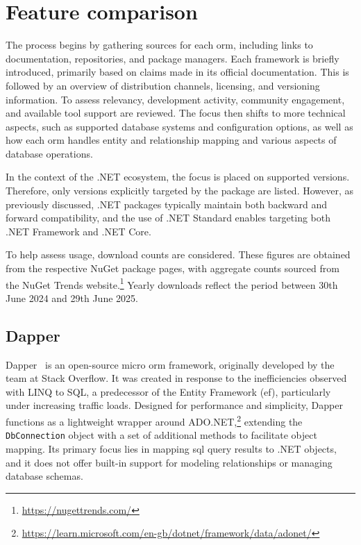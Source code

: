 \section{Feature comparison}
The process begins by gathering sources for each \acrshort{orm}, including links to documentation, repositories, and package managers. Each framework is briefly introduced, primarily based on claims made in its official documentation. This is followed by an overview of distribution channels, licensing, and versioning information. To assess relevancy, development activity, community engagement, and available tool support are reviewed. The focus then shifts to more technical aspects, such as supported database systems and configuration options, as well as how each \acrshort{orm} handles entity and relationship mapping and various aspects of database operations.

In the context of the .NET ecosystem, the focus is placed on supported versions. Therefore, only versions explicitly targeted by the package are listed. However, as previously discussed, .NET packages typically maintain both backward and forward compatibility, and the use of .NET Standard enables targeting both .NET Framework and .NET Core.

To help assess usage, download counts are considered. These figures are obtained from the respective NuGet package pages, with aggregate counts sourced from the NuGet Trends website.\footnote{\url{https://nugettrends.com/}} Yearly downloads reflect the period between 30th June 2024 and 29th June 2025.

\subsection{Dapper}
\label{sec:feat_dapper}

Dapper~\cite{Dapper,DapperRepo} is an open-source micro \acrshort{orm} framework, originally developed by the team at Stack Overflow. It was created in response to the inefficiencies observed with LINQ to SQL, a predecessor of the Entity Framework (\acrshort{ef}), particularly under increasing traffic loads. Designed for performance and simplicity, Dapper functions as a lightweight wrapper around ADO.NET,\footnote{\url{https://learn.microsoft.com/en-gb/dotnet/framework/data/adonet/}} extending the \texttt{DbConnection} object with a set of additional methods to facilitate object mapping. Its primary focus lies in mapping \acrshort{sql} query results to .NET objects, and it does not offer built-in support for modeling relationships or managing database schemas.

